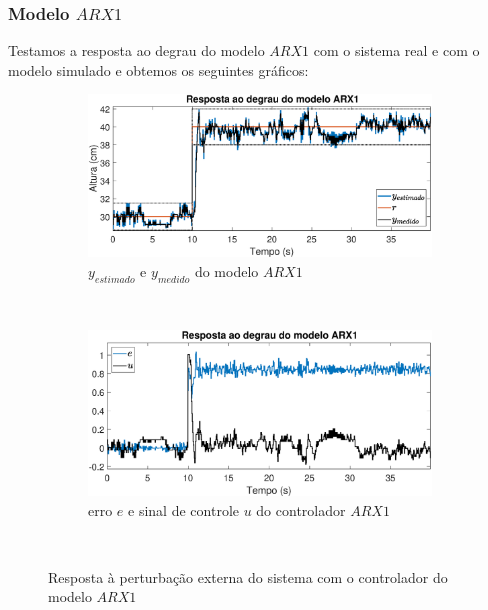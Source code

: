 \subsubsection{Modelo $ARX1$}
Testamos a resposta ao degrau do modelo $ARX1$ com o sistema real e com o modelo simulado e obtemos os seguintes gráficos:
\begin{figure}[htb]
	\centering
	\begin{subfigure}[t]{0.48\textwidth}
		\includegraphics[width=1\linewidth]{steprarx1y}
		\caption[$y_{estimado}$ e $y_{medido}$ do modelo $ARX1$]{$y_{estimado}$ e $y_{medido}$ do modelo $ARX1$}
		\label{fig:steprarx1y}
	\end{subfigure}
	~ %
	\begin{subfigure}[t]{0.48\textwidth}
		\includegraphics[width=1\linewidth]{steprarx1e}
		\caption[erro $e$ e sinal de controle $u$ do controlador $ARX1$]{erro $e$ e sinal de controle $u$ do controlador $ARX1$}
		\label{fig:steprarx1e}
	\end{subfigure}
	~ %
	
	\caption{Resposta à perturbação externa do sistema com o controlador do modelo $ARX1$}\label{fig:steprarx1}
\end{figure}



